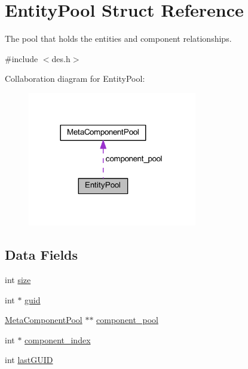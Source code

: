 \hypertarget{struct_entity_pool}{}\section{Entity\+Pool Struct Reference}
\label{struct_entity_pool}


The pool that holds the entities and component relationships.  




{\ttfamily \#include $<$des.\+h$>$}



Collaboration diagram for Entity\+Pool\+:\nopagebreak
\begin{figure}[H]
\begin{center}
\leavevmode
\includegraphics[width=209pt]{struct_entity_pool__coll__graph}
\end{center}
\end{figure}
\subsection*{Data Fields}
\begin{DoxyCompactItemize}
\item 
int \mbox{\hyperlink{struct_entity_pool_a439227feff9d7f55384e8780cfc2eb82}{size}}
\item 
int $\ast$ \mbox{\hyperlink{struct_entity_pool_a662c49cdd0bdc65d6ce8380c45290bca}{guid}}
\item 
\mbox{\hyperlink{struct_meta_component_pool}{Meta\+Component\+Pool}} $\ast$$\ast$ \mbox{\hyperlink{struct_entity_pool_ad75884ed3133e339a80f0eb00e0bd974}{component\+\_\+pool}}
\item 
int $\ast$ \mbox{\hyperlink{struct_entity_pool_ac5c84e33e66445aa6755a43a7b70ca72}{component\+\_\+index}}
\item 
int \mbox{\hyperlink{struct_entity_pool_aefadcdd88d2e6364fd584f35c374d324}{last\+G\+U\+ID}}
\end{DoxyCompactItemize}


